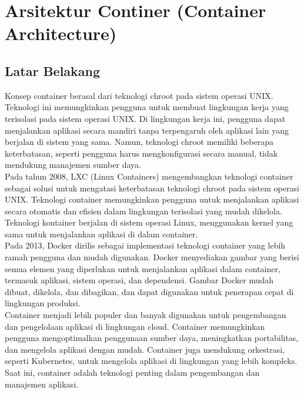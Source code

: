 
\chapter{Arsitektur Continer (Container Architecture)}

\section{Latar Belakang}
Konsep container berasal dari teknologi chroot pada sistem operasi UNIX. Teknologi ini memungkinkan pengguna untuk membuat lingkungan kerja yang terisolasi pada sistem operasi UNIX. Di lingkungan kerja ini, pengguna dapat menjalankan aplikasi secara mandiri tanpa terpengaruh oleh aplikasi lain yang berjalan di sistem yang sama. Namun, teknologi chroot memiliki beberapa keterbatasan, seperti pengguna harus mengkonfigurasi secara manual, tidak mendukung manajemen sumber daya.\\
 
Pada tahun 2008, LXC (Linux Containers) mengembangkan teknologi container sebagai solusi untuk mengatasi keterbatasan teknologi chroot pada sistem operasi UNIX. Teknologi container memungkinkan pengguna untuk menjalankan aplikasi secara otomatis dan efisien dalam lingkungan terisolasi yang mudah dikelola. Teknologi kontainer berjalan di sistem operasi Linux, menggunakan kernel yang sama untuk menjalankan aplikasi di dalam container.\\

Pada 2013, Docker dirilis sebagai implementasi teknologi container yang lebih ramah pengguna dan mudah digunakan. Docker menyediakan gambar yang berisi semua elemen yang diperlukan untuk menjalankan aplikasi dalam container, termasuk aplikasi, sistem operasi, dan dependensi. Gambar Docker mudah dibuat, dikelola, dan dibagikan, dan dapat digunakan untuk penerapan cepat di lingkungan produksi.\\

Container menjadi lebih populer dan banyak digunakan untuk pengembangan dan pengelolaan aplikasi di lingkungan cloud. Container memungkinkan pengguna mengoptimalkan penggunaan sumber daya, meningkatkan portabilitas, dan mengelola aplikasi dengan mudah. Container juga mendukung orkestrasi, seperti Kubernetes, untuk mengelola aplikasi di lingkungan yang lebih kompleks. Saat ini, container adalah teknologi penting dalam pengembangan dan manajemen aplikasi.
